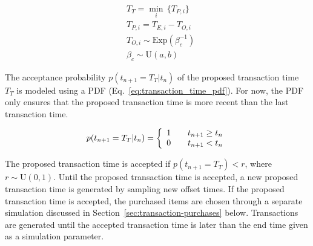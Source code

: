 \documentclass[conference]{IEEEtran}
\begin{document}
\begin{align} \label{eq:transaction-times}
&T_T = \min_i \, \{  T_{P, i}\} \\
&T_{P, i} = T_{E,i} - T_{O, i} \nonumber\\
&T_{O, i} \sim \text{Exp}(\beta^{-1}_c) \nonumber \\
&\beta_c \sim \text{U}(a, b) \nonumber
\end{align}

The acceptance probability $p(t_{n+1}=T_T|t_n)$ of the proposed transaction time $T_T$ is modeled using a PDF (Eq.~\ref{eq:transaction_time_pdf}). For now, the PDF only ensures that the proposed transaction time is more recent than the last transaction time.


\begin{equation} \label{eq:transaction_time_pdf}
p(t_{n+1}=T_T|t_n) = \left\{ 
  \begin{array}{l l}
   1 & \quad t_{n+1} \geq t_n\\
   0 & \quad t_{n+1} < t_n
  \end{array} \right.
\end{equation}

The proposed transaction time is accepted if $p(t_{n+1}=T_T) < r$, where $r \sim \text{U}(0, 1)$. Until the proposed transaction time is accepted, a new proposed transaction time is generated by sampling new offset times. If the proposed transaction time is accepted, the purchased items are chosen through a separate simulation discussed in Section~\ref{sec:transaction-purchases} below. Transactions are generated until the accepted transaction time is later than the end time given as a simulation parameter.
\end{document}
